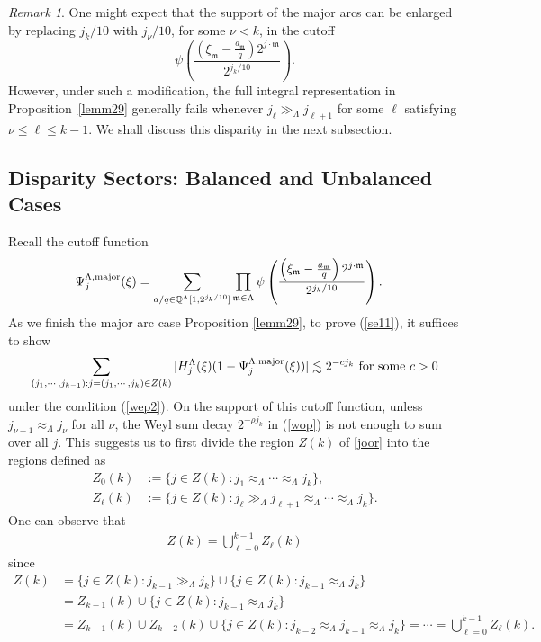 \documentclass[11 pt,letterpaper]{amsart}
\theoremstyle{plain}
\theoremstyle{definition}
\theoremstyle{remark} \theoremstyle{exam} \theoremstyle{ob}
\newtheorem{remark}{Remark}\numberwithin{remark}{section}
\numberwithin{equation}{section}
\begin{document}
\begin{remark}
	One might expect that the support of the major arcs can be enlarged by replacing 
	$j_k/10$ with $j_\nu/10$, for some  $\nu<k$, in the cutoff
	\[
	\psi\!\left(
	\frac{\left(\xi_{\mathfrak{m}} - \frac{a_{\mathfrak{m}}}{q}\right)
		2^{j\cdot \mathfrak{m}}}{2^{j_k/10}}
	\right).
	\]
	However, under such a modification, the full integral representation in Proposition~\ref{lemm29} generally fails whenever
	$
	j_{\ell} \gg_{\Lambda} j_{\ell+1}  
	$ for some $\ell$ satisfying  $\nu\le \ell\le k-1$. We shall discuss this disparity in the next subsection.	
\end{remark}

 \subsection{Disparity Sectors: Balanced and Unbalanced Cases}\label{sec30}
Recall the cutoff function
\begin{align} \label{100s}
	\Psi^{\Lambda,\rm{major}}_{j}(\xi)&=\sum_{a/q\in \mathbb{Q}^{\Lambda}[1,2^{j_k/10}]} 
	\prod_{\mathfrak{m}\in\Lambda} \psi\left( 
	\frac{ \left(\xi_{\mathfrak{m}}-\frac{a_{\mathfrak{m}} }{q}\right)      2^{j\cdot \mathfrak{m}}    }{  2^{j_k/10}  }   \right).
\end{align} 
As   we finish the  major arc case  Proposition \ref{lemm29},
to prove  (\ref{se11}), it suffices to show 
\begin{align}\label{rr18}
	\sum_{(j_1,\cdots,j_{k-1}):j=(j_1,\cdots,j_k)\in Z(k)}|H^{\Lambda}_j(\xi)(1-\Psi^{\Lambda,\rm{major}}_{j}(\xi))|\lesssim 2^{-cj_k}\ \text{for some $c>0$}
\end{align} 
under the  condition (\ref{wep2}). 
On the support of this cutoff function, unless $j_{\nu-1}\approx_{\Lambda} j_\nu$ for all $\nu$,  the Weyl sum decay $2^{-\rho j_k}$   in (\ref{wop})  is not enough to sum over all $j$.
This   suggests us to first divide the region $Z(k)$ of \eqref{joor} 
 into the regions
defined as
\begin{align*}
Z_0(k)&:=\{ j\in Z(k):   j_{1}\approx_{\Lambda}  \cdots\approx_{\Lambda} j_k\}, \\
	Z_{\ell}(k)&:=\{j\in Z(k):   j_\ell\gg_{\Lambda} j_{\ell+1}\approx_{\Lambda}\cdots\approx_{\Lambda} j_k\}. 
\end{align*}
One can observe that
\begin{align*}
	Z(k)=\bigcup_{\ell=0}^{k-1}Z_{\ell}(k) 
\end{align*}
since   
\begin{align*}
	Z(k)&=  \{j\in Z(k): j_{k-1}\gg_{\Lambda} j_k\} \cup \{j\in Z(k): j_{k-1}\approx_{\Lambda} j_k\}\\
	&=Z_{k-1}(k)\cup  \{j\in Z(k): j_{k-1}\approx_{\Lambda} j_k\}\\
	&= Z_{k-1}(k)\cup Z_{k-2}(k)\cup  \{j\in Z(k): j_{k-2}\approx_{\Lambda} j_{k-1}\approx_{\Lambda} j_k\}=\cdots=\bigcup_{\ell=0}^{k-1}Z_{\ell}(k).
\end{align*}
\end{document}

